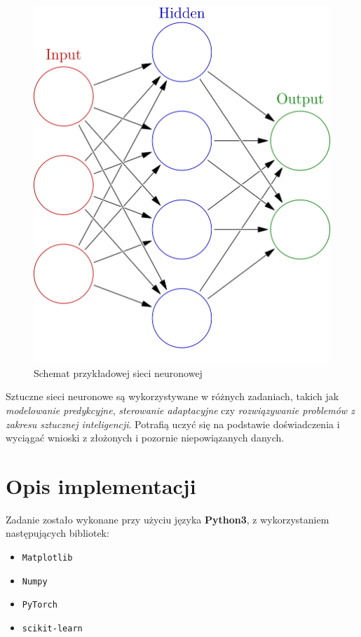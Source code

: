 \documentclass{classrep}
\begin{document}
\begin{figure}[h!]
	\centering
	\includegraphics[scale=0.2]{nn.png}
	\caption{Schemat przykładowej sieci neuronowej}
	\label{fig:nn}
\end{figure}

Sztuczne sieci neuronowe są wykorzystywane w różnych zadaniach, takich jak \textit{modelowanie predykcyjne}, \textit{sterowanie adaptacyjne} czy \textit{rozwiązywanie problemów z zakresu sztucznej inteligencji}. Potrafią uczyć się na podstawie doświadczenia i wyciągać wnioski z złożonych i pozornie niepowiązanych danych.

\clearpage{}
\section{Opis implementacji}

Zadanie zostało wykonane przy użyciu języka \textbf{Python3}, z wykorzystaniem następujących bibliotek:

\begin{itemize}
	\item \texttt{Matplotlib}
	\item \texttt{Numpy}
	\item \texttt{PyTorch}
	\item \texttt{scikit-learn}
\end{itemize}
\end{document}
